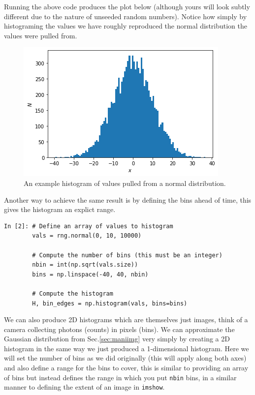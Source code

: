 Running the above code produces the plot below (although yours will look subtly different due to the nature of unseeded random numbers). Notice how simply by histograming the values we have roughly reproduced the normal distribution the values were pulled from.

\begin{figure}[H]
	\centering
	\includegraphics[scale=0.7]{Pictures/histexample.png}
\caption{An example histogram of values pulled from a normal distribution.}
\label{fig:randimgnoax}
\end{figure}

Another way to achieve the same result is by defining the bins ahead of time, this gives the histogram an explict range.

\begin{lstlisting}[style=PY]
In [2]: # Define an array of values to histogram
        vals = rng.normal(0, 10, 10000)
        
        # Compute the number of bins (this must be an integer)
        nbin = int(np.sqrt(vals.size))
        bins = np.linspace(-40, 40, nbin)
        
        # Compute the histogram 
        H, bin_edges = np.histogram(vals, bins=bins)
\end{lstlisting}

We can also produce 2D histograms which are themselves just images, think of a camera collecting photons (counts) in pixels (bins). We can approximate the Gaussian distribution from Sec.\ref{sec:maniimg} very simply by creating a 2D histogram in the same way we just produced a 1-dimensional histogram. Here we will set the number of bins as we did originally (this will apply along both axes) and also define a range for the bins to cover, this is similar to providing an array of bins but instead defines the range in which you put \texttt{nbin} bins, in a similar manner to defining the extent of an image in \texttt{imshow}.

